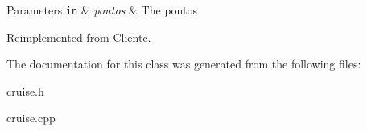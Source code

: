 \begin{DoxyParams}[1]{Parameters}
\mbox{\tt in}  & {\em pontos} & The pontos \\
\hline
\end{DoxyParams}


Reimplemented from \hyperlink{classCliente_ac56e5f622d2fc636e204fad0d7c3a36b}{Cliente}.



The documentation for this class was generated from the following files\+:\begin{DoxyCompactItemize}
\item 
cruise.\+h\item 
cruise.\+cpp\end{DoxyCompactItemize}
